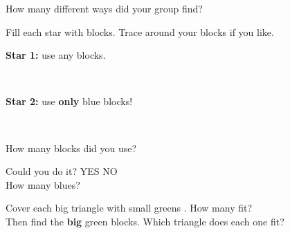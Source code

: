 \vspace{0.3in}
How many different ways did your group find?\quad \ansbox

\vspace{0.25in}
\actualsize
\newpage

Fill each star with blocks. Trace around your blocks if you like.

\vspace{0.2in}
\noindent
\begin{minipage}[t]{3.6in}\centering
\textbf{Star 1:} use any blocks.\\[2pt]
\parbox[c][0.45in][c]{3.6in}{\centering{}\; \; \; }\\[0.15in]
\end{minipage}\hfill
\begin{minipage}[t]{3.6in}\centering
\textbf{Star 2:} use \textbf{only} blue blocks!\\[2pt]
\parbox[c][0.45in][c]{3.6in}{\centering{}\; \; }\\[0.15in]
\end{minipage}

\vspace{0.3in}
\noindent
\begin{minipage}[t]{3.6in}\centering
How many blocks did you use?\quad \ansbox
\end{minipage}\hfill
\begin{minipage}[t]{3.6in}\centering
Could you do it? \quad YES \quad NO\\[0.2in]
How many blues?\quad \ansbox
\end{minipage}

\vspace{0.2in}

\vspace{0.12in}
\actualsize
\newpage

Cover each big triangle with small greens . How many fit?\\[2pt]
Then find the \textbf{big} green blocks. Which triangle does each one fit?

